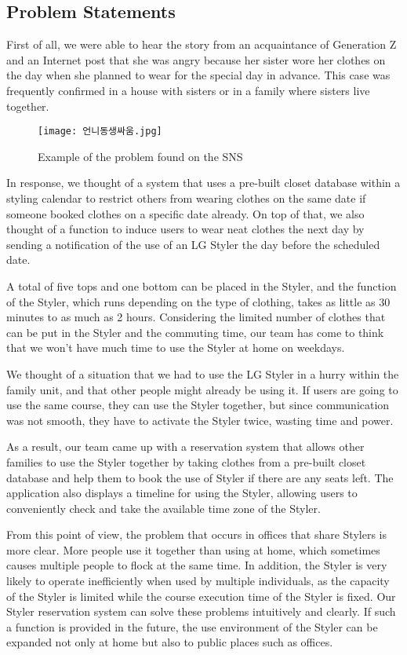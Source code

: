 \documentclass[conference]{IEEEtran}
\begin{document}
\subsection{Problem Statements}
First of all, we were able to hear the story from an acquaintance of Generation Z and an Internet post that she was angry because her sister wore her clothes on the day when she planned to wear for the special day in advance. This case was frequently confirmed in a house with sisters or in a family where sisters live together.\\

\newpage
  \begin{figure}[htbp]
        \centerline{\texttt{[image: 언니동생싸움.jpg]}}
        \caption{Example of the problem found on the SNS}
        \label{fig}
    \end{figure}
In response, we thought of a system that uses a pre-built closet database within a styling calendar to restrict others from wearing clothes on the same date if someone booked clothes on a specific date already. On top of that, we also thought of a function to induce users to wear neat clothes the next day by sending a notification of the use of an LG Styler the day before the scheduled date.

A total of five tops and one bottom can be placed in the Styler, and the function of the Styler, which runs depending on the type of clothing, takes as little as 30 minutes to as much as 2 hours. Considering the limited number of clothes that can be put in the Styler and the commuting time, our team has come to think that we won't have much time to use the Styler at home on weekdays.

We thought of a situation that we had to use the LG Styler in a hurry within the family unit, and that other people might already be using it. If users are going to use the same course, they can use the Styler together, but since communication was not smooth, they have to activate the Styler twice, wasting time and power.

As a result, our team came up with a reservation system that allows other families to use the Styler together by taking clothes from a pre-built closet database and help them to book the use of Styler if there are any seats left. The application also displays a timeline for using the Styler, allowing users to conveniently check and take the available time zone of the Styler.

From this point of view, the problem that occurs in offices that share Stylers is more clear. More people use it together than using at home, which sometimes causes multiple people to flock at the same time. In addition, the Styler is very likely to operate inefficiently when used by multiple individuals, as the capacity of the Styler is limited while the course execution time of the Styler is fixed. Our Styler reservation system can solve these problems intuitively and clearly. If such a function is provided in the future, the use environment of the Styler can be expanded not only at home but also to public places such as offices.
\end{document}
